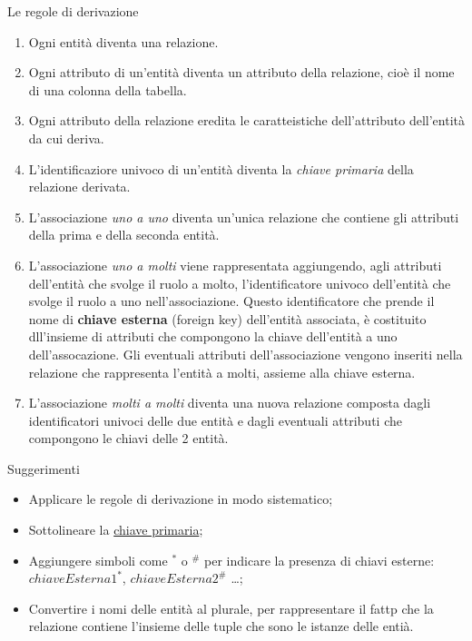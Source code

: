 %
\begin{frame}[allowframebreaks]{Le regole di derivazione}
\begin{enumerate}
    \item Ogni entit\`a diventa una relazione.
    \item Ogni attributo di un'entit\`a diventa un attributo della relazione, cio\`e il nome di una colonna della tabella.
    \item Ogni attributo della relazione eredita le caratteistiche dell'attributo dell'entit\`a da cui deriva.
    \item L'identificaziore univoco di un'entit\`a diventa la \textit{chiave primaria} della relazione derivata.
    \item L'associazione \textit{uno a uno} diventa un'unica relazione che contiene gli attributi della prima e della seconda entit\`a.
    \item L'associazione \textit{uno a molti} viene rappresentata aggiungendo, agli attributi dell'entit\`a che svolge il ruolo a molto, l'identificatore univoco dell'entit\`a che svolge il ruolo a uno nell'associazione. Questo identificatore che prende il nome di \textbf{chiave esterna} (foreign key) dell'entit\`a associata, \`e costituito dll'insieme di attributi che compongono la chiave dell'entit\`a a uno dell'assocazione. Gli eventuali attributi dell'associazione vengono inseriti nella relazione che rappresenta l'entit\`a a molti, assieme alla chiave esterna.
    \item L'associazione \textit{molti a molti} diventa una nuova relazione composta dagli identificatori univoci delle due entit\`a e dagli eventuali attributi che compongono le chiavi delle 2 entit\`a.
\end{enumerate}
\end{frame}
%
\begin{frame}{Suggerimenti}
\begin{itemize}[<+->]
    \item Applicare le regole di derivazione in modo sistematico;
    \item Sottolineare la \underline{chiave primaria};
    \item Aggiungere simboli come $^*$ o $^\#$ per indicare la presenza di chiavi esterne: $chiaveEsterna1^*$, $chiaveEsterna2^\#$ \ldots;
    \item Convertire i nomi delle entit\`a al plurale, per rappresentare il fattp che la relazione contiene l'insieme delle tuple che sono le istanze delle enti\`a.
\end{itemize}
\end{frame}
